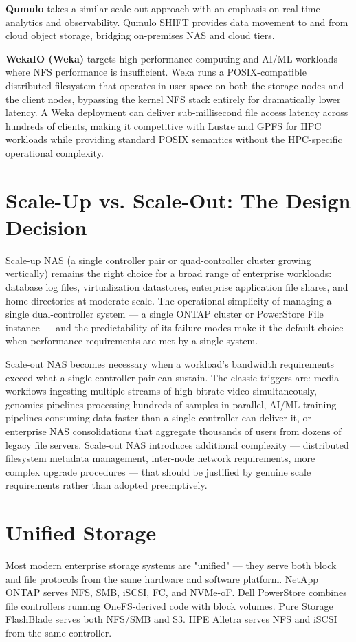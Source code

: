 \textbf{Qumulo} takes a similar scale-out approach with an emphasis on real-time analytics and observability. Qumulo SHIFT provides data movement to and from cloud object storage, bridging on-premises NAS and cloud tiers.

\textbf{WekaIO (Weka)} targets high-performance computing and AI/ML workloads where NFS performance is insufficient. Weka runs a POSIX-compatible distributed filesystem that operates in user space on both the storage nodes and the client nodes, bypassing the kernel NFS stack entirely for dramatically lower latency. A Weka deployment can deliver sub-millisecond file access latency across hundreds of clients, making it competitive with Lustre and GPFS for HPC workloads while providing standard POSIX semantics without the HPC-specific operational complexity.

\section{Scale-Up vs. Scale-Out: The Design Decision}
Scale-up NAS (a single controller pair or quad-controller cluster growing vertically) remains the right choice for a broad range of enterprise workloads: database log files, virtualization datastores, enterprise application file shares, and home directories at moderate scale. The operational simplicity of managing a single dual-controller system --- a single ONTAP cluster or PowerStore File instance --- and the predictability of its failure modes make it the default choice when performance requirements are met by a single system.

Scale-out NAS becomes necessary when a workload's bandwidth requirements exceed what a single controller pair can sustain. The classic triggers are: media workflows ingesting multiple streams of high-bitrate video simultaneously, genomics pipelines processing hundreds of samples in parallel, AI/ML training pipelines consuming data faster than a single controller can deliver it, or enterprise NAS consolidations that aggregate thousands of users from dozens of legacy file servers. Scale-out NAS introduces additional complexity --- distributed filesystem metadata management, inter-node network requirements, more complex upgrade procedures --- that should be justified by genuine scale requirements rather than adopted preemptively.

\section{Unified Storage}
Most modern enterprise storage systems are "unified" --- they serve both block and file protocols from the same hardware and software platform. NetApp ONTAP serves NFS, SMB, iSCSI, FC, and NVMe-oF. Dell PowerStore combines file controllers running OneFS-derived code with block volumes. Pure Storage FlashBlade serves both NFS/SMB and S3. HPE Alletra serves NFS and iSCSI from the same controller.

